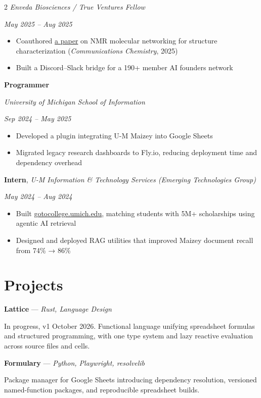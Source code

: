 \documentclass[11pt,letterpaper]{article}
\begin{document}
\begin{multicols}{2}
\textit{Enveda Biosciences / True Ventures Fellow}

\textit{May 2025 – Aug 2025}

\begin{itemize}
  \item Coauthored \href{https://doi.org/10.1038/s42004-025-01839-x}{a paper} on NMR molecular networking for structure characterization (\textit{Communications Chemistry}, 2025)
  \item Built a Discord–Slack bridge for a 190+ member AI founders network
\end{itemize}
\textbf{Programmer}

\textit{University of Michigan School of Information}

\textit{Sep 2024 – May 2025}

\begin{itemize}
  \item Developed a plugin integrating U-M Maizey into Google Sheets
  \item Migrated legacy research dashboards to Fly.io, reducing deployment time and dependency overhead
\end{itemize}
\textbf{Intern}, \textit{U-M Information \& Technology Services (Emerging Technologies Group)}

\textit{May 2024 – Aug 2024}

\begin{itemize}
  \item Built \href{https://gotocollege.umich.edu}{gotocollege.umich.edu}, matching students with 5M+ scholarships using agentic AI retrieval
  \item Designed and deployed RAG utilities that improved Maizey document recall from 74\% → 86\%
\end{itemize}

\columnbreak

\section*{Projects}
\textbf{Lattice} — \textit{Rust, Language Design}

In progress, v1 October 2026. Functional language unifying spreadsheet formulas and structured programming, with one type system and lazy reactive evaluation across source files and cells.

\textbf{Formulary} — \textit{Python, Playwright, resolvelib}

Package manager for Google Sheets introducing dependency resolution, versioned named-function packages, and reproducible spreadsheet builds.


\end{multicols}
\end{document}
